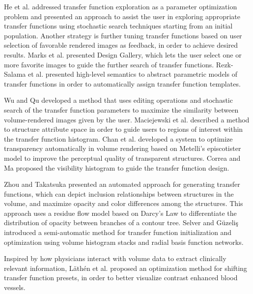 He et al. \cite{he_generation_1996} addressed transfer function exploration as a parameter optimization problem and presented an approach to assist the user in exploring appropriate transfer functions using stochastic search techniques starting from an initial population.
Another strategy is further tuning transfer functions based on user selection of favorable rendered images as feedback, in order to achieve desired results.
Marks et al. \cite{marks_design_1997} presented Design Gallery, which lets the user select one or more favorite images to guide the further search of transfer functions.
Rezk-Salama et al. \cite{rezk-salama_automatic_2000} presented high-level semantics to abstract parametric models of transfer functions in order to automatically assign transfer function templates.

Wu and Qu \cite{wu_interactive_2007} developed a method that uses editing operations and stochastic search of the transfer function parameters to maximize the similarity between volume-rendered images given by the user.
Maciejewski et al. \cite{maciejewski_structuring_2009} described a method to structure attribute space in order to guide users to regions of interest within the transfer function histogram.
Chan et al. \cite{chan_perception-based_2009} developed a system to optimize transparency automatically in volume rendering based on Metelli's episcotister model to improve the perceptual quality of transparent structures.
Correa and Ma \cite{correa_visibility-driven_2009} proposed the visibility histogram to guide the transfer function design.

Zhou and Takatsuka \cite{zhou_automatic_2009} presented an automated approach for generating transfer functions, which can depict inclusion relationships between structures in the volume, and maximize opacity and color differences among the structures. This approach uses a residue flow model based on Darcy's Law to differentiate the distribution of opacity between branches of a contour tree.
Selver and G{\"u}zeli{\c s} \cite{alper_selver_semiautomatic_2009} introduced a semi-automatic method for transfer function initialization and optimization using volume histogram stacks and radial basis function networks.

Inspired by how physicians interact with volume data to extract clinically relevant information, L{\"a}th{\'e}n et al. \cite{lathen_automatic_2012} proposed an optimization method for shifting transfer function presets, in order to better visualize contrast enhanced blood vessels.

